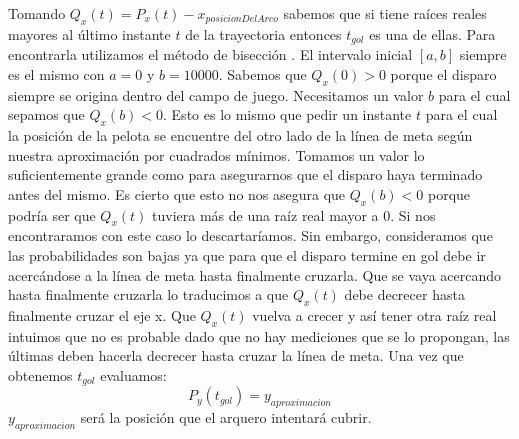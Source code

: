 Tomando $Q_x(t) = P_x(t) - x_{posicionDelArco}$ sabemos que si tiene raíces reales mayores al último instante $t$ de la trayectoria 
entonces $t_{gol}$ es una de ellas. Para encontrarla utilizamos el método de bisección \cite[]{BoostSite}. 
El intervalo inicial $[a,b]$ siempre es el mismo con $a = 0$ y $b = 10000$. Sabemos que $Q_x(0) > 0$ porque el disparo siempre se origina
dentro del campo de juego. Necesitamos un valor $b$ para el cual sepamos que $Q_x(b) < 0$. Esto es lo mismo que pedir un instante $t$
para el cual la posición de la pelota se encuentre del otro lado de la línea de meta según nuestra aproximación por cuadrados mínimos. 
Tomamos un valor lo suficientemente grande como para asegurarnos que el disparo haya terminado antes del mismo. Es cierto que esto
no nos asegura que $Q_x(b) < 0$ porque podría ser que $Q_x(t)$ tuviera más de una raíz real mayor a 0. Si nos encontraramos con este caso
lo descartaríamos. Sin embargo, consideramos que las probabilidades son bajas ya que para que el disparo termine en gol debe ir acercándose
a la línea de meta hasta finalmente cruzarla. Que se vaya acercando hasta finalmente cruzarla lo traducimos a que $Q_x(t)$ debe decrecer hasta finalmente
cruzar el eje x. Que $Q_x(t)$ vuelva a crecer y así tener otra raíz real intuimos que no es probable dado que no hay mediciones que se lo propongan,
las últimas deben hacerla decrecer hasta cruzar la línea de meta. 
Una vez que obtenemos 
$t_{gol}$ evaluamos: 
\begin{displaymath}
  P_y(t_{gol}) = y_{aproximacion}
\end{displaymath}
$y_{aproximacion}$ será la posición que el arquero intentará cubrir.
\par

